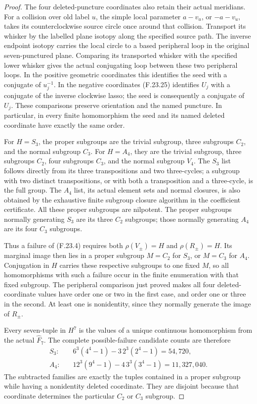 \begin{proof}
The four deleted-puncture coordinates also retain their
actual meridians. For a collision over old label $u$, the
simple local parameter $a-v_u$, or $-a-v_u$, takes its
counterclockwise source circle once around that collision.
Transport its whisker by the labelled plane isotopy along
the specified source path. The inverse endpoint isotopy
carries the local circle to a based peripheral loop in the
original seven-punctured plane. Comparing its transported
whisker with the specified lower whisker gives the actual
conjugating loop between these two peripheral loops.
In the positive geometric coordinates this identifies the
seed with a conjugate of $u_j^{-1}$. In the negative
coordinates (F.23.25) identifies $U_j$ with a conjugate of
the inverse clockwise lasso; the seed is consequently a
conjugate of $U_j$. These comparisons preserve orientation
and the named puncture. In particular, in every finite
homomorphism the seed and its named deleted coordinate
have exactly the same order.

For $H=S_3$, the proper subgroups are the trivial subgroup,
three subgroups $C_2$, and the normal subgroup $C_3$.
For $H=A_4$, they are the trivial subgroup, three subgroups
$C_2$, four subgroups $C_3$, and the normal subgroup $V_4$.
The $S_3$ list follows directly from its three transpositions
and two three-cycles; a subgroup with two distinct
transpositions, or with both a transposition and a
three-cycle, is the full group. The $A_4$ list, its actual
element sets and normal closures, is also obtained by the
exhaustive finite subgroup closure algorithm in the
coefficient certificate. All these
proper subgroups are nilpotent. The proper subgroups
normally generating $S_3$ are its three $C_2$ subgroups;
those normally generating $A_4$ are its four $C_3$ subgroups.

Thus a failure of (F.23.4) requires both
$\rho(V_\pm)=H$ and $\rho(R_\pm)=H$. Its marginal image
then lies in a proper subgroup $M=C_2$ for $S_3$, or
$M=C_3$ for $A_4$. Conjugation in $H$ carries these respective
subgroups to one fixed $M$, so all homomorphisms with such
a failure occur in the finite enumeration with that fixed
subgroup. The peripheral comparison just proved makes all
four deleted-coordinate values have order one or two in
the first case, and order one or three in the second.
At least one is nonidentity, since they normally generate
the image of $R_\pm$.

Every seven-tuple in $H^7$ is the values of a unique
continuous homomorphism from the actual $\widehat F_7$.
The complete possible-failure candidate counts are therefore
\[
 \begin{aligned}
 S_3:&\quad 6^3(4^4-1)-3\,2^3(2^4-1)=54,720,\\
 A_4:&\quad 12^3(9^4-1)-4\,3^3(3^4-1)=11,327,040.
 \end{aligned}                                                \tag{F.23.30}
\]
The subtracted families are exactly the tuples contained
in a proper subgroup while having a nonidentity deleted
coordinate. They are disjoint because that coordinate
determines the particular $C_2$ or $C_3$ subgroup.


\end{proof}
